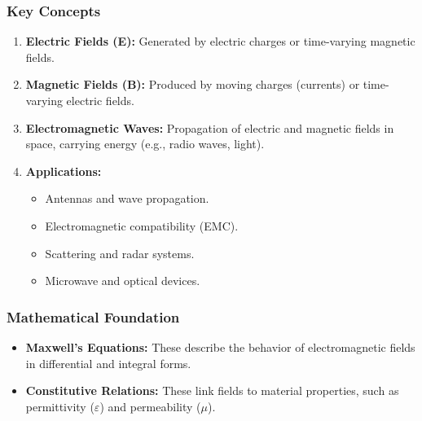 \documentclass[12pt]{article}
\begin{document}
\subsubsection{Key Concepts}
\begin{enumerate}
    \item \textbf{Electric Fields (E):} Generated by electric charges or time-varying magnetic fields.
    \item \textbf{Magnetic Fields (B):} Produced by moving charges (currents) or time-varying electric fields.
    \item \textbf{Electromagnetic Waves:} Propagation of electric and magnetic fields in space, carrying energy (e.g., radio waves, light).
    \item \textbf{Applications:}
          \begin{itemize}
              \item Antennas and wave propagation.
              \item Electromagnetic compatibility (EMC).
              \item Scattering and radar systems.
              \item Microwave and optical devices.
          \end{itemize}
\end{enumerate}

\subsubsection{Mathematical Foundation}
\begin{itemize}
    \item \textbf{Maxwell’s Equations:} These describe the behavior of electromagnetic fields in differential and integral forms.
    \item \textbf{Constitutive Relations:} These link fields to material properties, such as permittivity ($\varepsilon$) and permeability ($\mu$).
\end{itemize}
\end{document}
